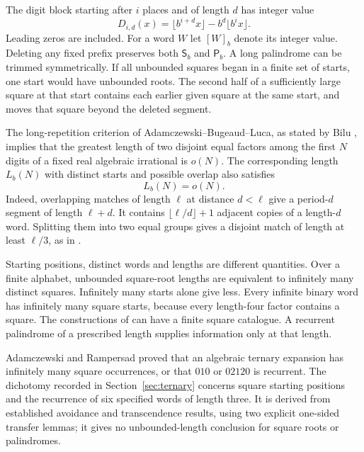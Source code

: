 \documentclass[11pt,reqno,a4paper]{amsart}
\theoremstyle{remark}
\begin{document}
The digit block starting after $i$ places and of length $d$ has integer value
\begin{equation}\label{eq:digitblock}
 D_{i,d}(x)=\lfloor b^{i+d}x\rfloor-b^d\lfloor b^i x\rfloor.
\end{equation}
Leading zeros are included. For a word $W$ let $[W]_b$ denote its integer value. Deleting any fixed prefix preserves both $\mathsf S_b$ and $\mathsf P_b$. A long palindrome can be trimmed symmetrically. If all unbounded squares began in a finite set of starts, one start would have unbounded roots. The second half of a sufficiently large square at that start contains each earlier given square at the same start, and moves that square beyond the deleted segment.

The long-repetition criterion of Adamczewski--Bugeaud--Luca, as stated by Bilu \cite[Theorem~3.3, p.~8]{Bilu}, implies that the greatest length of two disjoint equal factors among the first $N$ digits of a fixed real algebraic irrational is $o(N)$. The corresponding length $L_b(N)$ with distinct starts and possible overlap also satisfies
\begin{equation}\label{eq:known-early}
 L_b(N)=o(N).
\end{equation}
Indeed, overlapping matches of length $\ell$ at distance $d<\ell$ give a period-$d$ segment of length $\ell+d$. It contains $\lfloor\ell/d\rfloor+1$ adjacent copies of a length-$d$ word. Splitting them into two equal groups gives a disjoint match of length at least $\ell/3$, as in \cite[Lemma~3.4]{Bilu}.

Starting positions, distinct words and lengths are different quantities. Over a finite alphabet, unbounded square-root lengths are equivalent to infinitely many distinct squares. Infinitely many starts alone give less. Every infinite binary word has infinitely many square starts, because every length-four factor contains a square. The constructions of \cite{RSW,BC} can have a finite square catalogue. A recurrent palindrome of a prescribed length supplies information only at that length.

Adamczewski and Rampersad \cite[Theorem~3.1]{AR} proved that an algebraic ternary expansion has infinitely many square occurrences, or that $010$ or $02120$ is recurrent. The dichotomy recorded in Section~\ref{sec:ternary} concerns square starting positions and the recurrence of six specified words of length three. It is derived from established avoidance and transcendence results, using two explicit one-sided transfer lemmas; it gives no unbounded-length conclusion for square roots or palindromes.
\end{document}
